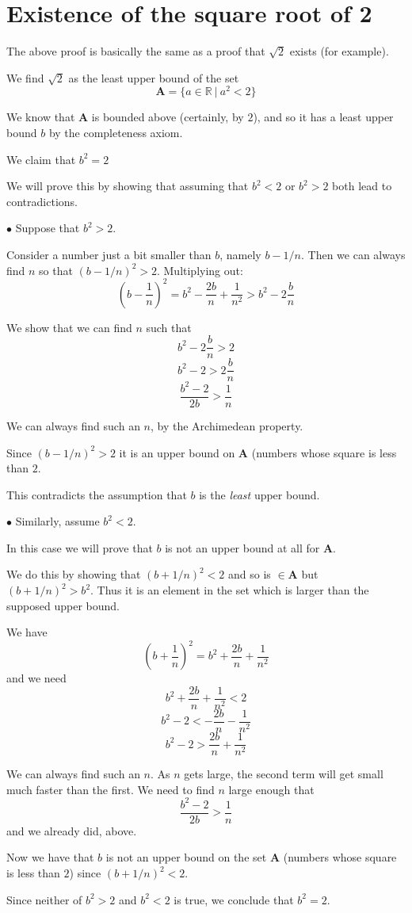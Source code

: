 \documentclass[11pt, oneside]{article}
\begin{document}
\section{Existence of the square root of 2}

The above proof is basically the same as a proof that $\sqrt{2}$ exists (for example). 

We find $\sqrt{2}$ as the least upper bound of the set 
\[ \mathbf{A} = \{a \in \mathbb{R} \ | \ a^2 < 2 \} \]

We know that $\mathbf{A}$ is bounded above (certainly, by $2$), and so it has a least upper bound $b$ by the completeness axiom.

We claim that $b^2 = 2$

We will prove this by showing that assuming that $b^2 < 2$ or $b^2 > 2$ both lead to contradictions.

$\bullet$  Suppose that $b^2 > 2$.

Consider a number just a bit smaller than $b$, namely $b - 1/n$.  Then we can always find $n$ so that $(b - 1/n)^2 > 2$. Multiplying out:
\[ (b - \frac{1}{n})^2 = b^2 - \frac{2b}{n} + \frac{1}{n^2} > b^2 - 2 \frac{b}{n} \]

We show that we can find $n$ such that 
\[ b^2 - 2 \frac{b}{n} > 2 \]
\[ b^2 - 2 > 2 \frac{b}{n} \]
\[ \frac{b^2 - 2}{2b} > \frac{1}{n} \]

We can always find such an $n$, by the Archimedean property.

Since $(b - 1/n)^2 > 2$ it is an upper bound on $\mathbf{A}$ (numbers whose square is less than $2$.

This contradicts the assumption that $b$ is the \emph{least} upper bound.

$\bullet$  Similarly, assume $b^2 < 2$.  

In this case we will prove that $b$ is not an upper bound at all for $\mathbf{A}$.

We do this by showing that $(b + 1/n)^2 < 2$ and so is $\in \mathbf{A}$ but $(b + 1/n)^2 > b^2$.  Thus it is an element in the set which is larger than the supposed upper bound.

We have
\[ (b + \frac{1}{n})^2 = b^2 + \frac{2b}{n} + \frac{1}{n^2} \]
and we need
\[ b^2 + \frac{2b}{n} + \frac{1}{n^2} < 2 \]
\[ b^2 - 2 <  -\frac{2b}{n} - \frac{1}{n^2}  \]
\[ b^2 - 2 >  \frac{2b}{n} + \frac{1}{n^2}  \]

We can always find such an $n$.  As $n$ gets large, the second term will get small much faster than the first.  We need to find $n$ large enough that
\[ \frac{b^2 - 2}{2b} >  \frac{1}{n} \]
and we already did, above.

Now we have that $b$ is not an upper bound on the set $\mathbf{A}$ (numbers whose square is less than $2$) since $(b + 1/n)^2 < 2$.

Since neither of $b^2 > 2$ and $b^2 < 2$ is true, we conclude that $b^2 = 2$.
\end{document}
